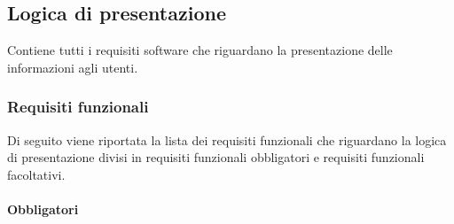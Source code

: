 \subsection{Logica di presentazione}
Contiene tutti i requisiti software che riguardano la presentazione delle informazioni agli utenti.

\subsubsection{Requisiti funzionali}
Di seguito viene riportata la lista dei requisiti funzionali che riguardano la logica di presentazione divisi in requisiti funzionali obbligatori e requisiti funzionali facoltativi.

\paragraph{Obbligatori}

